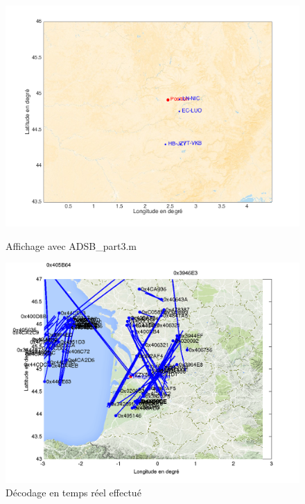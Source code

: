 \documentclass[a4paper, 10pt]{article}
\begin{document}
        \begin{figure}[h!]
        \begin{minipage}[b]{0.45\linewidth}
    	    \centering
    	    \includegraphics[scale=0.4]{plot_part3.png}
            \caption{Affichage avec \textsf{ADSB\_part3.m}}
        \end{minipage} \hfill
        \begin{minipage}[b]{.45\linewidth}
    	    \centering
    	    \includegraphics[scale=0.4]{figureEleve.png}
            \caption{Décodage en temps réel effectué}
        \end{minipage}
    \end{figure}
    
\end{document}
